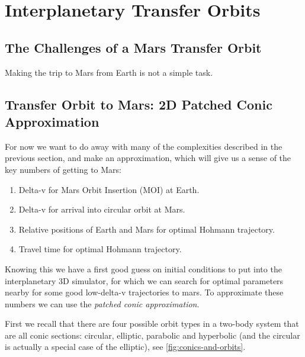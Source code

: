 \section{Interplanetary Transfer Orbits}

\subsection{The Challenges of a Mars Transfer Orbit}
Making the trip to Mars from Earth is not a simple task. 

\subsection{Transfer Orbit to Mars: 2D Patched Conic Approximation} \label{sec:2d-patched-conic}
For now we want to do away with many of the complexities described in the previous section, and make an approximation, which will give us a sense of the key numbers of getting to Mars:
\begin{enumerate}
	\item Delta-v for Mars Orbit Insertion (MOI) at Earth.
	\item Delta-v for arrival into circular orbit at Mars.
	\item Relative positions of Earth and Mars for optimal Hohmann trajectory.
	\item Travel time for optimal Hohmann trajectory.
\end{enumerate}

Knowing this we have a first good guess on initial conditions to put into the interplanetary 3D simulator, for which we can search for optimal parameters nearby for some good low-delta-v trajectories to mars. To approximate these numbers we can use the \emph{patched conic approximation}.

First we recall that there are four possible orbit types in a two-body system that are all conic sections: circular, elliptic, parabolic and hyperbolic (and the circular is actually a special case of the elliptic), see \cref{fig:conics-and-orbits}.

